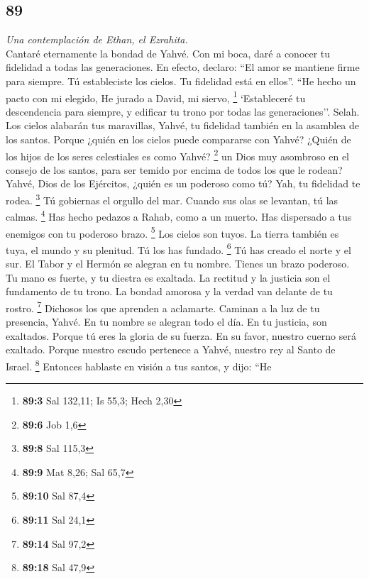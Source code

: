 \begin{paracol}{2}
\hypertarget{section-176}{%
\section{89}\label{section-176}}

\emph{Una contemplación de Ethan, el Ezrahita.}\\
 Cantaré eternamente la bondad de Yahvé. Con mi boca, daré
a conocer tu fidelidad a todas las generaciones.  En
efecto, declaro: ``El amor se mantiene firme para siempre. Tú
estableciste los cielos. Tu fidelidad está en ellos''. 
``He hecho un pacto con mi elegido, He jurado a David, mi siervo,
\footnote{\textbf{89:3} Sal 132,11; Is 55,3; Hech 2,30} 
`Estableceré tu descendencia para siempre, y edificar tu trono por todas
las generaciones''. Selah.  Los cielos alabarán tus
maravillas, Yahvé, tu fidelidad también en la asamblea de los santos.
 Porque ¿quién en los cielos puede compararse con Yahvé?
¿Quién de los hijos de los seres celestiales es como Yahvé? \footnote{\textbf{89:6}
  Job 1,6}  un Dios muy asombroso en el consejo de los
santos, para ser temido por encima de todos los que le rodean?
 Yahvé, Dios de los Ejércitos, ¿quién es un poderoso como
tú? Yah, tu fidelidad te rodea. \footnote{\textbf{89:8} Sal 115,3}
 Tú gobiernas el orgullo del mar. Cuando sus olas se
levantan, tú las calmas. \footnote{\textbf{89:9} Mat 8,26; Sal 65,7}
 Has hecho pedazos a Rahab, como a un muerto. Has
dispersado a tus enemigos con tu poderoso brazo. \footnote{\textbf{89:10}
  Sal 87,4}  Los cielos son tuyos. La tierra también es
tuya, el mundo y su plenitud. Tú los has fundado. \footnote{\textbf{89:11}
  Sal 24,1}  Tú has creado el norte y el sur. El Tabor y
el Hermón se alegran en tu nombre.  Tienes un brazo
poderoso. Tu mano es fuerte, y tu diestra es exaltada. 
La rectitud y la justicia son el fundamento de tu trono. La bondad
amorosa y la verdad van delante de tu rostro. \footnote{\textbf{89:14}
  Sal 97,2}  Dichosos los que aprenden a aclamarte.
Caminan a la luz de tu presencia, Yahvé.  En tu nombre se
alegran todo el día. En tu justicia, son exaltados. 
Porque tú eres la gloria de su fuerza. En su favor, nuestro cuerno será
exaltado.  Porque nuestro escudo pertenece a Yahvé,
nuestro rey al Santo de Israel. \footnote{\textbf{89:18} Sal 47,9}
 Entonces hablaste en visión a tus santos, y dijo: ``He

\end{paracol}
